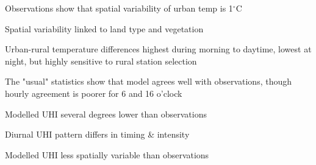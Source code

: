 \documentclass[draft,linenumbers]{agujournal}
\begin{document}





\begin{keypoints}
\item Observations show that spatial variability of urban temp is 1$^\circ$C 
\item Spatial variability linked to land type and vegetation 
\item Urban-rural temperature differences highest during morning to daytime, lowest at night, but highly sensitive to rural station selection
\item The "usual" statistics show that model agrees well with observations, though hourly agreement is poorer for 6 and 16 o'clock
\item Modelled UHI several degrees lower than observations
\item Diurnal UHI pattern differs in timing \& intensity
\item Modelled UHI less spatially variable than observations 
\end{keypoints}

%
%
\end{document}
